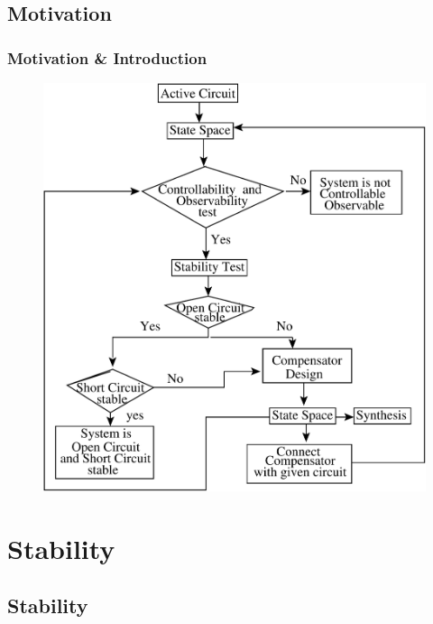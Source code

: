 \documentclass{beamer}
\begin{document}

\subsection*{Motivation}
\begin{frame}
\frametitle{Motivation \& Introduction}
\begin{small}

\begin{figure}
	\begin{center}
	
        \includegraphics[scale=0.25,angle=360]{./images/SAVE}
        \label{save}
	\end{center}
	\end{figure}
	\end{small}
\end{frame}



\section{Stability}

\subsection*{Stability}
\end{document}
